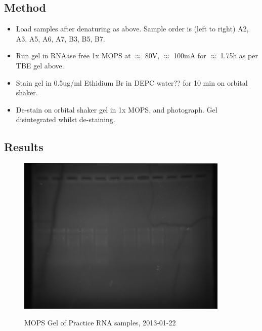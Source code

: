 \documentclass[12pt,a4paper]{book}
\begin{document}
    \subsection*{Method}
      \begin{itemize} \itemsep1pt \parskip0pt 
        \item Load samples after denaturing as above. Sample order is (left to right) A2, A3, A5, A6, A7, B3, B5, B7.
        \item Run gel in RNAase free 1x MOPS at $\approx$ 80V, $\approx$ 100mA for $\approx$ 1.75h as per TBE gel above.
        \item Stain gel in 0.5ug/ml Ethidium Br in DEPC water?? for 10 min on orbital shaker.
        \item De-stain on orbital shaker gel in 1x MOPS, and photograph. Gel disintegrated whilst de-staining.
      \end{itemize}

    \subsection*{Results}
      \begin{figure}[h!]
        \caption{MOPS Gel of Practice RNA samples, 2013-01-22}
        \centering
          \includegraphics[width=0.9\textwidth]{./jan/20130122-PracticeRNADenaturedMOPS}
        \label{fig:20130122-PracticeRNADenaturedMOPS}
      \end{figure}
\end{document}

